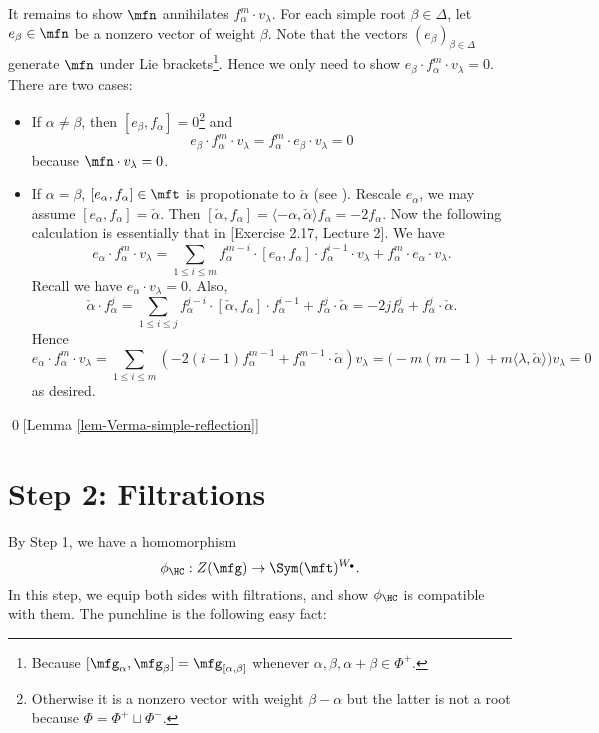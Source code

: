 		It remains to show $\mfn$ annihilates $f_\alpha^m \cdot v_\lambda$. For each simple root $\beta\in \Delta$, let $e_\beta\in \mfn$ be a nonzero vector of weight $\beta$. Note that the vectors $(e_\beta)_{\beta\in \Delta}$ generate $\mfn$ under Lie brackets\footnote{Because $[\mfg_\alpha,\mfg_\beta] = \mfg_{[\alpha,\beta]}$ whenever $\alpha,\beta,\alpha+\beta\in \Phi^+$.}. Hence we only need to show $e_\beta\cdot f_\alpha^m \cdot v_\lambda =0$. There are two cases:
		\begin{itemize}
			\item 
				If $\alpha\neq \beta$, then $[e_\beta,f_\alpha]=0$\footnote{Otherwise it is a nonzero vector with weight $\beta-\alpha$ but the latter is not a root because $\Phi = \Phi^+ \sqcup \Phi^-$.} and
				\[
					e_\beta\cdot f_\alpha^m \cdot v_\lambda = f_\alpha^m \cdot e_\beta \cdot v_\lambda = 0
				\]
				because $\mfn \cdot v_\lambda =0$.
			\item
				If $\alpha = \beta$, $[e_\alpha,f_\alpha]\in \mft$ is propotionate to $\check \alpha$ (see \cite[Prop. 8.3(d)]{H1}). Rescale $e_\alpha$, we may assume $[e_\alpha,f_\alpha ]= \check \alpha$. Then $[\check \alpha ,f_\alpha ]= \langle -\alpha,\check\alpha\rangle f_\alpha = -2f_\alpha$. Now the following calculation is essentially that in [Exercise 2.17, Lecture 2]. We have
				\[
					e_\alpha\cdot f_\alpha^m \cdot v_\lambda  = \sum_{1\le i\le m} f_\alpha^{m-i}\cdot [e_\alpha,f_\alpha] \cdot f_\alpha^{i-1}\cdot v_\lambda + f_\alpha^m \cdot e_\alpha \cdot v_\lambda.
				\]
				Recall we have $e_\alpha \cdot v_\lambda=0$. Also,
				\[
					\check \alpha \cdot f_\alpha^j = \sum_{1\le i\le j} f_\alpha^{j-i}\cdot [\check \alpha, f_\alpha] \cdot f_\alpha^{i-1} + f_\alpha^j  \cdot \check \alpha  = -2j f_\alpha^j +  f_\alpha^j  \cdot \check \alpha.
				\]
				Hence
				\[
					e_\alpha\cdot f_\alpha^m \cdot v_\lambda  = \sum_{1\le i\le m} (-2(i-1)f_\alpha^{m-1}+ f_\alpha^{m-1}\cdot \check\alpha ) v_\lambda = \big(-m(m-1) + m\langle \lambda,\check\alpha\rangle \big)v_\lambda = 0
				\]
				as desired.
		\end{itemize}
		
	\qed[Lemma \ref{lem-Verma-simple-reflection}]

\section{Step 2: Filtrations}
	
	By Step 1, we have a homomorphism
	\[
		\phi_\HC: Z(\mfg) \to \Sym(\mft)^{W_\bullet}.
	\]
	In this step, we equip both sides with filtrations, and show $\phi_\HC$ is compatible with them. The punchline is the following easy fact:

